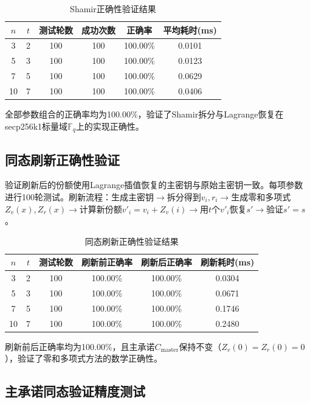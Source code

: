 \documentclass[UTF8,a4paper,zihao=-4,openany]{ctexrep}
\begin{document}
\begin{table}[H]
\centering
\caption{Shamir正确性验证结果}
\label{tab:shamir_test}
\begin{tabularx}{\textwidth}{cccccc}
\toprule
$n$ & $t$ & 测试轮数 & 成功次数 & 正确率 & 平均耗时(ms)\\
\midrule
3 & 2 & 100 & 100 & 100.00\% & 0.0101\\
5 & 3 & 100 & 100 & 100.00\% & 0.0123\\
7 & 5 & 100 & 100 & 100.00\% & 0.0629\\
10 & 7 & 100 & 100 & 100.00\% & 0.0406\\
\bottomrule
\end{tabularx}
\end{table}

全部参数组合的正确率均为100.00\%，验证了Shamir拆分与Lagrange恢复在secp256k1标量域$\mathbb{F}_q$上的实现正确性。

\subsection{同态刷新正确性验证}

验证刷新后的份额使用Lagrange插值恢复的主密钥与原始主密钥一致。每项参数进行100轮测试。刷新流程：生成主密钥$\to$拆分得到$v_i,r_i$$\to$生成零和多项式$Z_v(x),Z_r(x)$$\to$计算新份额$v'_i = v_i + Z_v(i)$$\to$用$t$个$v'_i$恢复$s'$$\to$验证$s' = s$。

\begin{table}[H]
\centering
\caption{同态刷新正确性验证结果}
\label{tab:refresh_test}
\begin{tabularx}{\textwidth}{cccccc}
\toprule
$n$ & $t$ & 测试轮数 & 刷新前正确率 & 刷新后正确率 & 刷新耗时(ms)\\
\midrule
3 & 2 & 100 & 100.00\% & 100.00\% & 0.0304\\
5 & 3 & 100 & 100.00\% & 100.00\% & 0.0671\\
7 & 5 & 100 & 100.00\% & 100.00\% & 0.1746\\
10 & 7 & 100 & 100.00\% & 100.00\% & 0.2480\\
\bottomrule
\end{tabularx}
\end{table}

刷新前后正确率均为100.00\%，且主承诺$C_{\text{master}}$保持不变（$Z_v(0)=Z_r(0)=0$），验证了零和多项式方法的数学正确性。

\subsection{主承诺同态验证精度测试}
\end{document}
